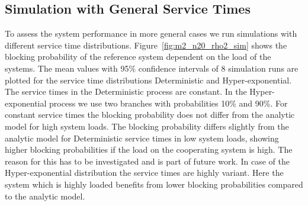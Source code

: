 \subsection{Simulation with General Service Times}\label{sec:simgeneral}

To assess the system performance in more general cases we run simulations with different service time distributions.
Figure~\ref{fig:m2_n20_rho2_sim} shows the blocking probability of the reference system dependent on the load of the systems. The mean values with 95\% confidence intervals of 8 simulation runs are plotted for the service time distributions Deterministic and Hyper-exponential.
The service times in the Deterministic process are constant.
In the Hyper-exponential process we use two branches with probabilities 10\% and 90\%.
For constant service times the blocking probability does not differ from the analytic model for high system loads. The blocking probability differs slightly from the analytic model for Deterministic service times in low system loads, showing higher blocking probabilities if the load on the cooperating system is high. The reason for this has to be investigated and is part of future work. In case of the Hyper-exponential distribution the service times are highly variant. Here the system which is highly loaded benefits from lower blocking probabilities compared to the analytic model.


